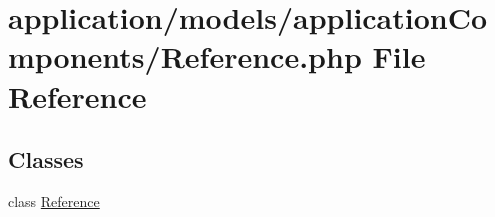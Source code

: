 \hypertarget{_reference_8php}{\section{application/models/application\-Components/\-Reference.php File Reference}
\label{_reference_8php}
}
\subsection*{Classes}
\begin{DoxyCompactItemize}
\item 
class \hyperlink{class_reference}{Reference}
\end{DoxyCompactItemize}
